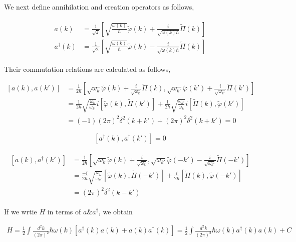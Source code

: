 ﻿\documentclass[twoside]{book}
\numberwithin{equation}{section}
\begin{document}
We next define annihilation and creation operators as follows, 

\begin{align}
\begin{split}
a(k) &= \frac{1}{\sqrt{2}}\left[\sqrt{\frac{\omega(k)}{\hbar}}\tilde{\varphi}(k)+\frac{i}{\sqrt{\omega(k)\hbar}}\tilde{\Pi}(k)\right]\\
a^\dagger(k) &= \frac{1}{\sqrt{2}}\left[\sqrt{\frac{\omega(k)}{\hbar}}\tilde{\varphi}(k)-\frac{i}{\sqrt{\omega(k)\hbar}}\tilde{\Pi}(k)\right]
\end{split}
\end{align}

Their commutation relations are calculated as follows, 

\[\begin{split}
[a(k),a(k')] &= \frac{1}{2\hbar}\left[\sqrt{\omega_k}\tilde{\varphi}(k)+\frac{i}{\sqrt{\omega_k}} \tilde{\Pi}(k), \sqrt{\omega_{k'}}\tilde{\varphi}(k')+\frac{i}{\sqrt{\omega_{k'}}}\tilde{\Pi}(k')\right] \\
&= \frac{1}{2\hbar}\sqrt{\frac{\omega_k}{\omega_{k'}}}i[\tilde{\varphi}(k),\tilde{\Pi}(k')] + \frac{1}{2\hbar}\sqrt{\frac{\omega_{k'}}{\omega_k}}i[\tilde{\Pi}(k),\tilde{\varphi}(k')] \\
&=(-1)(2\pi)^2\delta^2(k+k')+(2\pi)^2\delta^2(k+k')= 0 
\end{split}\]

\[[a^\dagger(k),a^\dagger(k')] = 0 \]

\begin{align}\begin{split}
[a(k),a^\dagger(k')] &= \frac{1}{2\hbar}\left[\sqrt{\omega_k}\tilde{\varphi}(k)+\frac{i}{\sqrt{\omega_k}}, \sqrt{\omega_{k'}}\tilde{\varphi}(-k') - \frac{i}{\sqrt{\omega_{k'}}}\tilde{\Pi}(-k')\right] \\
&= \frac{-i}{2\hbar}\sqrt{\frac{\omega_k}{\omega_{k'}}} [\tilde{\varphi}(k),\tilde{\Pi}(-k')] + \frac{i}{2\hbar}[\tilde{\Pi}(k),\tilde{\varphi}(-k')] \\
&= (2\pi)^2\delta^2(k-k')
\end{split}\end{align}

If we wrtie $H$ in terms of $a \& a^\dagger$, we obtain

\begin{align}
H = \frac{1}{2}\int \frac{d^2 k}{(2\pi)^2}\hbar\omega(k)[a^\dagger(k)a(k)+a(k)a^\dagger(k)] = \frac{1}{2}\int \frac{d^2 k}{(2\pi)^2}\hbar\omega(k)a^\dagger(k)a(k)+C
\end{align}
\end{document}
